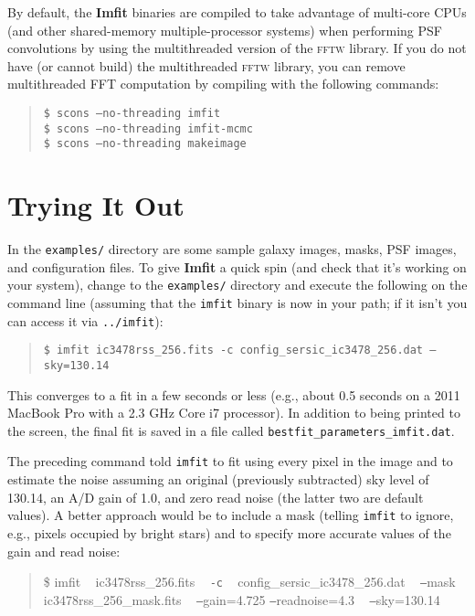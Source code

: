 \documentclass[10pt,a4paper,article]{memoir}
\newcommand{\imfit}{\textbf{Imfit}}
\newcommand{\Imfit}{\textbf{Imfit}}
\newcommand{\imfitprog}{\texttt{imfit}}
\begin{document}
By default, the \Imfit{} binaries are compiled to take advantage of
multi-core CPUs (and other shared-memory multiple-processor systems)
when performing PSF convolutions by using the multithreaded version of
the \textsc{fftw} library. If you do not have (or cannot build) the
multithreaded \textsc{fftw} library, you can remove multithreaded FFT
computation by compiling with the following commands:
\begin{quote}
\texttt{\$ scons --no-threading imfit} \\
\texttt{\$ scons --no-threading imfit-mcmc} \\
\texttt{\$ scons --no-threading makeimage}
\end{quote}





\newpage

\chapter{Trying It Out}

In the \texttt{examples/} directory are some sample galaxy images, masks, PSF images, and
configuration files. To give \imfit{} a quick spin (and check that it's working on your system), change to the
\texttt{examples/} directory and execute the following on the command line (assuming that
the \imfitprog{} binary is now in your path; if it isn't you can access it via
\texttt{../imfit}):
\begin{quote}
\texttt{\$ imfit ic3478rss\_256.fits \texttt{-c} config\_sersic\_ic3478\_256.dat \texttt{--}sky=130.14}
\end{quote}

This converges to a fit in a few seconds or less (e.g., about 0.5 seconds on a 
2011 MacBook Pro with a 2.3 GHz Core i7 processor). In addition to being printed to
the screen, the final fit is saved in a file called \texttt{bestfit\_parameters\_imfit.dat}.

The preceding command told \imfitprog{} to fit using every pixel in the image and to estimate
the noise assuming an original (previously subtracted) sky level of 130.14, an A/D gain
of 1.0, and zero read noise (the latter two are default values). A better approach would be 
to include a mask (telling \imfitprog{}
to ignore, e.g., pixels occupied by bright stars) and to specify more accurate values
of the gain and read noise:
\begin{quote}
\$ imfit ~ ic3478rss\_256.fits ~ \texttt{-c} ~ config\_sersic\_ic3478\_256.dat ~ \texttt{--}mask ~ ic3478rss\_256\_mask.fits ~ \texttt{--}gain=4.725 \texttt{--}readnoise=4.3 ~ \texttt{--}sky=130.14
\end{quote}
\end{document}
